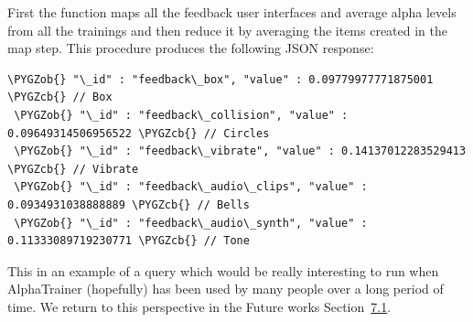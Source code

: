 \documentclass[a4paper,10pt,english,lof,lot,twoside]{puthesis}
\def\PYGZob{\char`\{}
\def\PYGZcb{\char`\}}
\begin{document}
First the function maps all the feedback user interfaces and average alpha levels
from all the trainings and then reduce it by averaging the items created in the
map step. This procedure produces the following JSON response:

\begin{Verbatim}[commandchars=\\\{\}]
 \PYGZob{} "\_id" : "feedback\_box", "value" : 0.09779977771875001 \PYGZcb{} // Box
 \PYGZob{} "\_id" : "feedback\_collision", "value" : 0.09649314506956522 \PYGZcb{} // Circles
 \PYGZob{} "\_id" : "feedback\_vibrate", "value" : 0.14137012283529413 \PYGZcb{} // Vibrate
 \PYGZob{} "\_id" : "feedback\_audio\_clips", "value" : 0.0934931038888889 \PYGZcb{} // Bells
 \PYGZob{} "\_id" : "feedback\_audio\_synth", "value" : 0.11333089719230771 \PYGZcb{} // Tone
\end{Verbatim}

This in an example of a query which would be really interesting to run when AlphaTrainer
(hopefully) has been used by many people over a long period of time. We return to this
perspective in the Future works Section {\hyperref[ch-conclusion/index:sec-future-work]{7.1}}.
\end{document}
